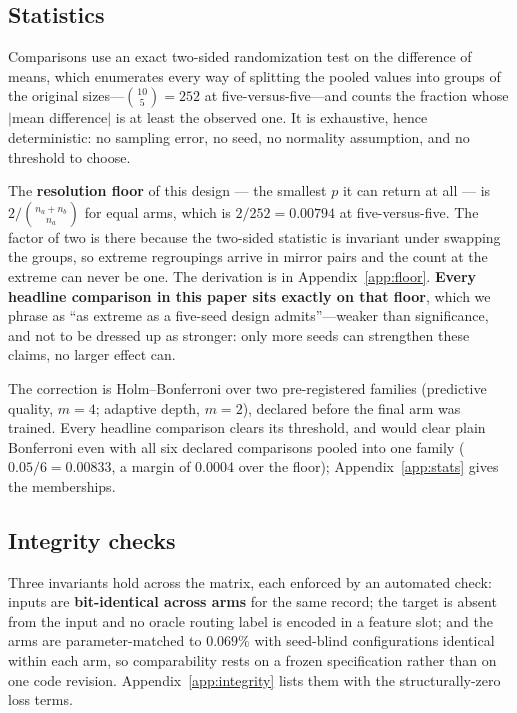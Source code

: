 \subsection{Statistics}
\label{sec:stats}

Comparisons use an exact two-sided randomization test on the difference of means,
which enumerates every way of splitting the pooled values into groups of the
original sizes---$\binom{10}{5} = 252$ at five-versus-five---and counts the
fraction whose $|$mean difference$|$ is at least the observed one. It is
exhaustive, hence deterministic: no sampling error, no seed, no normality
assumption, and no threshold to choose.

The \textbf{resolution floor} of this design --- the smallest $p$ it can return at
all --- is $2/\binom{n_a+n_b}{n_a}$ for equal arms, which is $2/252 = 0.00794$ at
five-versus-five. The factor of two is there because the two-sided statistic is
invariant under swapping the groups, so extreme regroupings arrive in mirror pairs
and the count at the extreme can never be one.
The derivation is in Appendix~\ref{app:floor}.
\textbf{Every headline comparison in this paper sits exactly on that floor}, which
we phrase as ``as extreme as a five-seed design admits''---weaker than
significance, and not to be dressed up as stronger: only more seeds can
strengthen these claims, no larger effect can.

The correction is Holm--Bonferroni over two pre-registered families (predictive quality, $m=4$; adaptive depth, $m=2$), declared before the final arm was trained. Every headline comparison clears its threshold, and would clear plain Bonferroni even with all six declared comparisons pooled into one family ($0.05/6=0.00833$, a margin of 0.0004 over the floor); Appendix~\ref{app:stats} gives the memberships.

\subsection{Integrity checks}\label{sec:integrity} Three invariants hold across the matrix, each enforced by an automated check: inputs are \textbf{bit-identical across arms} for the same record; the target is absent from the input and no oracle routing label is encoded in a feature slot; and the arms are parameter-matched to $0.069\%$ with seed-blind configurations identical within each arm, so comparability rests on a frozen specification rather than on one code revision. Appendix~\ref{app:integrity} lists them with the structurally-zero loss terms.
